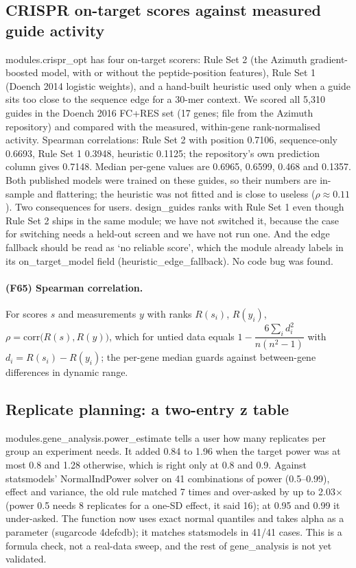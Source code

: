 \subsection{CRISPR on-target scores against measured guide activity}
modules.crispr\_opt has four on-target scorers: Rule Set 2 (the Azimuth gradient-boosted model, with or without the peptide-position features), Rule Set 1 (Doench 2014 logistic weights), and a hand-built heuristic used only when a guide sits too close to the sequence edge for a 30-mer context. We scored all 5,310 guides in the Doench 2016 FC+RES set (17 genes; file from the Azimuth repository) and compared with the measured, within-gene rank-normalised activity. Spearman correlations: Rule Set 2 with position 0.7106, sequence-only 0.6693, Rule Set 1 0.3948, heuristic 0.1125; the repository's own prediction column gives 0.7148. Median per-gene values are 0.6965, 0.6599, 0.468 and 0.1357. Both published models were trained on these guides, so their numbers are in-sample and flattering; the heuristic was not fitted and is close to useless ($\rho\approx0.11$). Two consequences for users. design\_guides ranks with Rule Set 1 even though Rule Set 2 ships in the same module; we have not switched it, because the case for switching needs a held-out screen and we have not run one. And the edge fallback should be read as `no reliable score', which the module already labels in its on\_target\_model field (heuristic\_edge\_fallback). No code bug was found.
\paragraph{(F65) Spearman correlation.} For scores $s$ and measurements $y$ with ranks $R(s_i)$, $R(y_i)$, $\rho=\mathrm{corr}\big(R(s),R(y)\big)$, which for untied data equals $1-\dfrac{6\sum_i d_i^2}{n(n^2-1)}$ with $d_i=R(s_i)-R(y_i)$; the per-gene median guards against between-gene differences in dynamic range.
\subsection{Replicate planning: a two-entry z table}
modules.gene\_analysis.power\_estimate tells a user how many replicates per group an experiment needs. It added 0.84 to 1.96 when the target power was at most 0.8 and 1.28 otherwise, which is right only at 0.8 and 0.9. Against statsmodels' NormalIndPower solver on 41 combinations of power (0.5--0.99), effect and variance, the old rule matched 7 times and over-asked by up to 2.03$\times$ (power 0.5 needs 8 replicates for a one-SD effect, it said 16); at 0.95 and 0.99 it under-asked. The function now uses exact normal quantiles and takes alpha as a parameter (sugarcode 4defcdb); it matches statsmodels in 41/41 cases. This is a formula check, not a real-data sweep, and the rest of gene\_analysis is not yet validated.
